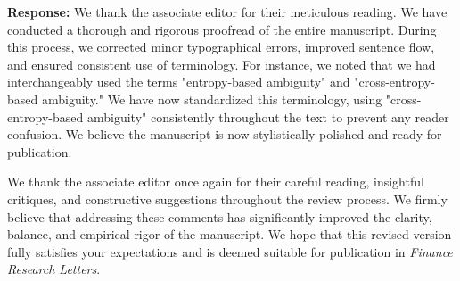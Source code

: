 \documentclass[12pt]{article}
\begin{document}
\begin{highlightbox}
\textbf{Response:} We thank the associate editor for their meticulous reading. We have conducted a thorough and rigorous proofread of the entire manuscript. During this process, we corrected minor typographical errors, improved sentence flow, and ensured consistent use of terminology. For instance, we noted that we had interchangeably used the terms "entropy-based ambiguity" and "cross-entropy-based ambiguity." We have now standardized this terminology, using "cross-entropy-based ambiguity" consistently throughout the text to prevent any reader confusion. We believe the manuscript is now stylistically polished and ready for publication.
\end{highlightbox}

\vspace{0.5cm}
We thank the associate editor once again for their careful reading, insightful critiques, and constructive suggestions throughout the review process. We firmly believe that addressing these comments has significantly improved the clarity, balance, and empirical rigor of the manuscript. We hope that this revised version fully satisfies your expectations and is deemed suitable for publication in \textit{Finance Research Letters}.
\end{document}
